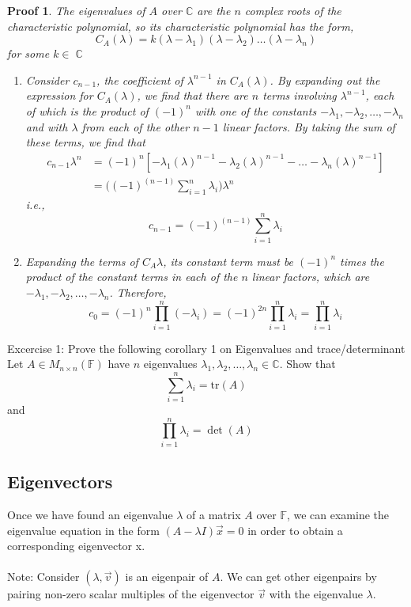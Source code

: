 \documentclass[10pt]{article}
\DeclareMathOperator{\C}{{\mathbb{C}}}
\theoremstyle{break}
\newtheorem*{pf}{Proof}
\begin{document}
\begin{pf}
  The eigenvalues of $A$ over $\mathbb{C}$ are the $n$ complex roots of the characteristic polynomial, so its characteristic polynomial has the form, $$C_A(\lambda) = k(\lambda - \lambda_1)(\lambda - \lambda_2) \dots (\lambda - \lambda_n)$$
  for some $k \in \C$
  \begin{enumerate}
    \item Consider $c_{n-1}$, the coefficient of $\lambda^{n-1}$ in $C_A(\lambda)$. By expanding out the expression for $C_A(\lambda)$, we find that there are $n$ terms involving $\lambda^{n-1}$, each of which is the product of $(-1)^n$ with one of the constants $-\lambda_1, -\lambda_2, \dots, -\lambda_n$ and with $\lambda$ from each of the other $n-1$ linear factors. By taking the sum of these terms, we find that 
          \begin{align*}
              c_{n-1}\lambda^n &= (-1)^n [-\lambda_1(\lambda)^{n-1} -\lambda_2(\lambda)^{n-1} - \dots - \lambda_n(\lambda)^{n-1}]\\
                      &= \Bigg((-1)^{(n-1)} \sum^{n}_{i=1} \lambda_i\Bigg)\lambda^n
          \end{align*}
          i.e., $$c_{n-1} = (-1)^{(n-1)}\sum^{n}_{i=1}\lambda_i$$
    \item Expanding the terms of $C_A{\lambda}$, its constant term must be $(-1)^n$ times the product of the constant terms in each of the $n$ linear factors, which are $-\lambda_1, -\lambda_2, \dots, -\lambda_n$. Therefore, 
          $$c_0 = (-1)^n \prod^n_{i=1}(-\lambda_i) = (-1)^{2n}\prod^n_{i=1}\lambda_i = \prod^n_{i=1}\lambda_i$$
  \end{enumerate}
\end{pf}
Excercise 1: Prove the following corollary 1 on Eigenvalues and trace/determinant\\
Let $A \in M_{n \times n}(\mathbb{F})$  have $n$ eigenvalues $\lambda_1, \lambda_2, \dots, \lambda_n \in \mathbb{C}$. Show that 
$$\sum^n_{i=1}\lambda_i = \text{tr}(A)$$ and $$\prod^n_{i=1}\lambda_i = \det(A)$$

\subsection{Eigenvectors}
Once we have found an eigenvalue $\lambda$ of a matrix $A$ over $\mathbb{F}$, we can examine the eigenvalue equation in the form $(A - \lambda I)\vec{x} = 0$  in order to obtain a corresponding eigenvector x.
\\ \; \\
Note: Consider $(\lambda, \vec{v})$ is an eigenpair of $A$. We can get other eigenpairs by pairing non-zero scalar multiples of the eigenvector $\vec{v}$ with the eigenvalue $\lambda$.
\end{document}
